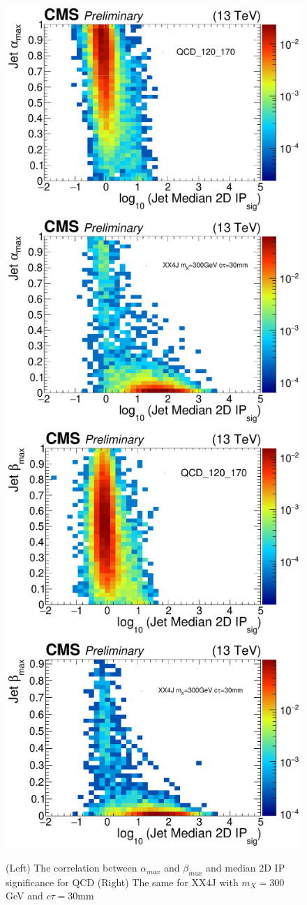 \begin{figure}
\begin{center}
\includegraphics[width=.45\textwidth]{figures/an_jetid/VTX_MATCH_IP/QCD_2D_medianipsig_alpha}
\includegraphics[width=.45\textwidth]{figures/an_jetid/VTX_MATCH_IP/XX4J_2D_medianipsig_alpha}
\includegraphics[width=.45\textwidth]{figures/an_jetid/VTX_MATCH_IP/QCD_2D_medianipsig_beta}
\includegraphics[width=.45\textwidth]{figures/an_jetid/VTX_MATCH_IP/XX4J_2D_medianipsig_beta}

\end{center}
\caption{(Left) The correlation between $\alpha_{max}$ and $\beta_{max}$ and median 2D IP significance for QCD (Right) The same for XX4J with $m_X=300$ GeV and $c\tau = 30$mm}
\label{fig:2d_alpha_beta_ipsig}
\end{figure}

